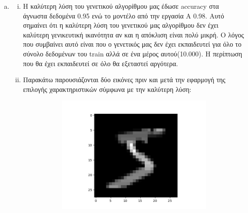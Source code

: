 \documentclass[12pt,a4paper]{article}
\newcommand{\tl}{\textlatin}
\begin{document}
            \begin{enumerate}[a)]
                \item
                    \begin{enumerate}[i.]
                        \item Η καλύτερη λύση του γενετικού αλγορίθμου μας έδωσε
                            \tl{accuracy} στα άγνωστα δεδομένα 0.95 ενώ το
                            μοντέλο από την εργασία Α 0.98. Αυτό σημαίνει ότι η
                            καλύτερη λύση του γενετικού μας αλγορίθμου δεν έχει
                            καλύτερη γενικευτική ικανότητα αν και η απόκλιση
                            είναι πολύ μικρή. Ο λόγος που συμβαίνει αυτό είναι
                            που ο γενετικός μας δεν έχει εκπαιδευτεί για όλο το
                            σύνολο δεδομένων του \tl{train} αλλά σε ένα μέρος
                            αυτού(10.000). Η περίπτωση που θα έχει εκπαιδευτεί
                            σε όλο θα εξεταστεί αργότερα.
                            \\
                        \item Παρακάτω παρουσιάζονται δύο εικόνες πριν και μετά
                            την εφαρμογή της επιλογής χαρακτηριστικών σύμφωνα με
                            την καλύτερη λύση: 
                            \begin{figure}[H]
                                \begin{subfigure}{0.5\textwidth}
                                    \raggedleft
                                    \includegraphics[width=\textwidth]{images/im2.png}

\end{subfigure}
\end{figure}
\end{enumerate}
\end{enumerate}
\end{document}
